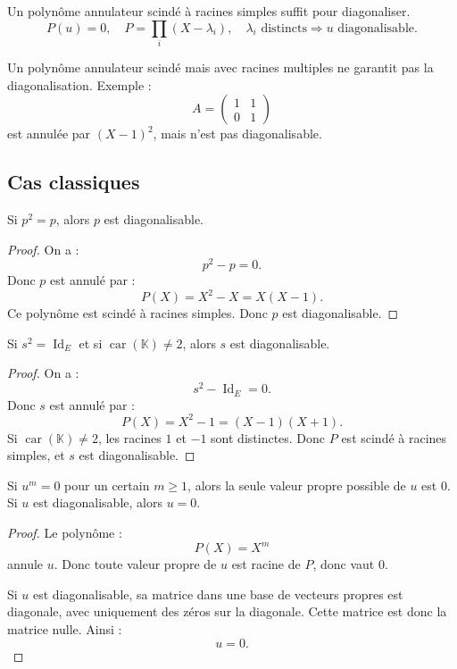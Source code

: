 \documentclass[11pt,a4paper]{article}
\newcommand{\K}{\mathbb K}
\newcommand{\Id}{\operatorname{Id}}
\begin{document}
\begin{retenirbox}
Un polynôme annulateur scindé à racines simples suffit pour diagonaliser.
\[
P(u)=0,\quad P=\prod_i(X-\lambda_i),\quad \lambda_i\text{ distincts}
\Longrightarrow
u\text{ diagonalisable}.
\]
\end{retenirbox}

\begin{erreurbox}
Un polynôme annulateur scindé mais avec racines multiples ne garantit pas la diagonalisation.  
Exemple :
\[
A=
\begin{pmatrix}
1&1\\
0&1
\end{pmatrix}
\]
est annulée par \((X-1)^2\), mais n'est pas diagonalisable.
\end{erreurbox}

\subsection{Cas classiques}

\begin{theorembox}[Projecteurs]
Si \(p^2=p\), alors \(p\) est diagonalisable.
\end{theorembox}

\begin{proof}
On a :
\[
p^2-p=0.
\]
Donc \(p\) est annulé par :
\[
P(X)=X^2-X=X(X-1).
\]
Ce polynôme est scindé à racines simples.  
Donc \(p\) est diagonalisable.
\end{proof}

\begin{theorembox}[Involutions]
Si \(s^2=\Id_E\) et si \(\operatorname{car}(\K)\neq2\), alors \(s\) est diagonalisable.
\end{theorembox}

\begin{proof}
On a :
\[
s^2-\Id_E=0.
\]
Donc \(s\) est annulé par :
\[
P(X)=X^2-1=(X-1)(X+1).
\]
Si \(\operatorname{car}(\K)\neq2\), les racines \(1\) et \(-1\) sont distinctes.  
Donc \(P\) est scindé à racines simples, et \(s\) est diagonalisable.
\end{proof}

\begin{theorembox}[Nilpotents]
Si \(u^m=0\) pour un certain \(m\geq1\), alors la seule valeur propre possible de \(u\) est \(0\).  
Si \(u\) est diagonalisable, alors \(u=0\).
\end{theorembox}

\begin{proof}
Le polynôme :
\[
P(X)=X^m
\]
annule \(u\).  
Donc toute valeur propre de \(u\) est racine de \(P\), donc vaut \(0\).

Si \(u\) est diagonalisable, sa matrice dans une base de vecteurs propres est diagonale, avec uniquement des zéros sur la diagonale.  
Cette matrice est donc la matrice nulle.  
Ainsi :
\[
u=0.
\]
\end{proof}
\end{document}
